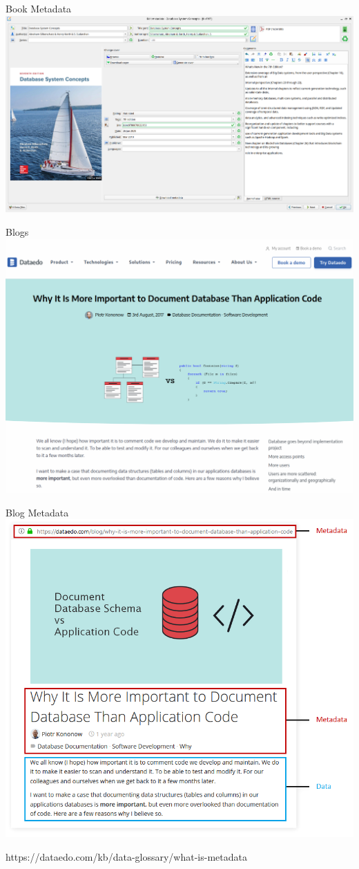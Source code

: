 \documentclass{beamer}
\newcommand{\toRight}[1]{
    \begin{FlushRight}
        {\tiny #1}
    \end{FlushRight}
} %
\begin{document}
\begin{frame}{Book Metadata}
    \centering
    \includegraphics[width=\textwidth]{figures/bookmeta}
\end{frame}
\begin{frame}{Blogs}
    \centering
    \includegraphics[width=\textwidth]{figures/blog}
\end{frame}
\begin{frame}{Blog Metadata}
    \centering
    \includegraphics[width=.8\textwidth]{figures/blogmeta}
    \vspace{-5mm}
    \toRight{https://dataedo.com/kb/data-glossary/what-is-metadata}
\end{frame}
\end{document}

